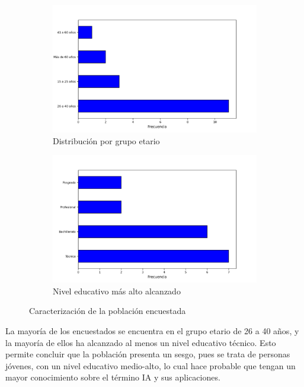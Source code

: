 \documentclass[12pt,a4paper]{article}
\begin{document}
\begin{figure}[h!]
    \centering
    \begin{subfigure}{0.45\linewidth}
        \centering
        \includegraphics[width=\linewidth]{resultados/1_En que grupo etario se encuentra.jpg}
        \caption{Distribución por grupo etario}
        \label{fig:f1}
    \end{subfigure}
    \hfill
    \begin{subfigure}{0.45\linewidth}
        \centering
        \includegraphics[width=\linewidth]{resultados/2_Cuál es el nivel educativo más alto que ha alcanzado.jpg}
        \caption{Nivel educativo más alto alcanzado}
        \label{fig:f2}
    \end{subfigure}
    \caption{Caracterización de la población encuestada}
\end{figure}

La mayoría de los encuestados se encuentra en el grupo etario de 26 a 40 años, y la mayoría de ellos 
ha alcanzado al menos un nivel educativo técnico. Esto permite concluir que la población presenta un sesgo, pues 
se trata de personas jóvenes, con un nivel educativo medio-alto, lo cual hace probable que tengan un 
mayor conocimiento sobre el término IA y sus aplicaciones.
\end{document}
